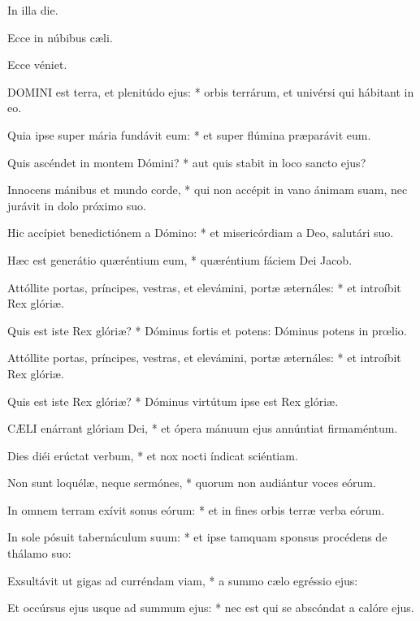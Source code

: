 
  In illa die.

  Ecce in núbibus cæli.

  Ecce véniet.


\lettrine[lines=2]{D}{OMINI} est terra, et plenitúdo ejus: * orbis terrárum, et univérsi qui hábitant in eo.

Quia ipse super mária fundávit eum: * et super flúmina præparávit eum.

Quis ascéndet in montem Dómini? * aut quis stabit in loco sancto ejus?

Innocens mánibus et mundo corde, * qui non accépit in vano ánimam suam, nec jurávit in dolo próximo suo.

Hic accípiet benedictiónem a Dómino: * et misericórdiam a Deo, salutári suo.

Hæc est generátio quæréntium eum, * quæréntium fáciem Dei Jacob.

Attóllite portas, príncipes, vestras, et elevámini, portæ æternáles: * et introíbit Rex glóriæ.

Quis est iste Rex glóriæ? * Dóminus fortis et potens: Dóminus potens in prœlio.

Attóllite portas, príncipes, vestras, et elevámini, portæ æternáles: * et introíbit Rex glóriæ.

Quis est iste Rex glóriæ? * Dóminus virtútum ipse est Rex glóriæ.


\lettrine[lines=2]{C}{ÆLI} enárrant glóriam Dei, * et ópera mánuum ejus annúntiat firmaméntum.

Dies diéi erúctat verbum, * et nox nocti índicat sciéntiam.

Non sunt loquélæ, neque sermónes, * quorum non audiántur voces eórum.

In omnem terram exívit sonus eórum: * et in fines orbis terræ verba eórum.

In sole pósuit tabernáculum suum: * et ipse tamquam sponsus procédens de thálamo suo:

Exsultávit ut gigas ad curréndam viam, * a summo cælo egréssio ejus:

Et occúrsus ejus usque ad summum ejus: * nec est qui se abscóndat a calóre ejus.

